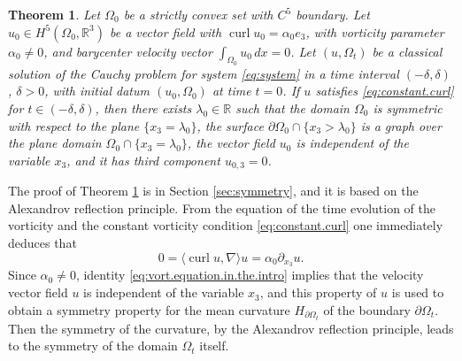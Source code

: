 \documentclass[10pt,reqno,a4paper]{article}
\numberwithin{equation}{section}
\theoremstyle{plain}
\newtheorem{theorem}{Theorem}[section]
\theoremstyle{definition}
\newcommand{\R}{{\mathbb R}}
\renewcommand{\a}{\alpha}
\newcommand{\lm}{\lambda}
\newcommand{\Om}{\Omega}
\newcommand{\la}{\langle}
\newcommand{\ra}{\rangle}
\newcommand{\pa}{\partial}
\newcommand{\grad}{\nabla}
\newcommand{\curl}{\operatorname{curl}}
\begin{document}
 
\begin{theorem} \label{thm:Cauchy.pb} 
Let $\Omega_0$ be a strictly convex set with $C^5$ boundary.
Let $u_0\in H^5(\Omega_0, \R^3)$ be a vector field with $\curl u_0 = \alpha_0 e_3$, 
with vorticity parameter $\a_0 \neq 0$,  
and barycenter velocity vector $\int_{\Om_0} u_0 \, dx = 0$. 
Let $(u, \Om_t)$ be a classical solution of the Cauchy problem for system \eqref{eq:system} 
in a time interval $(-\delta,\delta)$, $\delta > 0$, 
with initial datum $(u_0, \Om_0)$ at time $t=0$. 
If $u$ satisfies \eqref{eq:constant.curl} for $t \in (-\delta, \delta)$,
then there exists $\lm_0 \in \R$ such that the domain $\Omega_0$ is symmetric 
with respect to the plane $\{x_3=\lambda_0\}$, 
the surface $\pa \Omega_0 \cap \{x_3 > \lambda_0 \}$ is a graph over the plane domain 
$\Om_0 \cap \{ x_3 = \lm_0 \}$, 
the vector field $u_0$ is independent of the variable $x_3$, 
and it has third component $u_{0,3} = 0$.   
\end{theorem}

The proof of Theorem \ref{thm:Cauchy.pb} is in Section \ref{sec:symmetry}, and it 
is based on the Alexandrov reflection principle. 
From the equation of the time evolution of the vorticity 
and the constant vorticity condition \eqref{eq:constant.curl} 
one immediately deduces that 
\begin{equation} \label{eq:vort.equation.in.the.intro}
0 = \la \curl u , \grad \ra u = \alpha_0 \pa_{x_3} u. 
\end{equation}
Since $\a_0 \neq 0$, identity \eqref{eq:vort.equation.in.the.intro} 
implies that the velocity vector field $u$ is independent of the variable $x_3$, 
and this property of $u$ is used to obtain a symmetry property 
for the mean curvature $H_{\pa \Om_t}$ of the boundary $\pa \Om_t$. 
Then the symmetry of the curvature, by the Alexandrov reflection principle, 
leads to the symmetry of the domain $\Om_t$ itself. 
\end{document}
